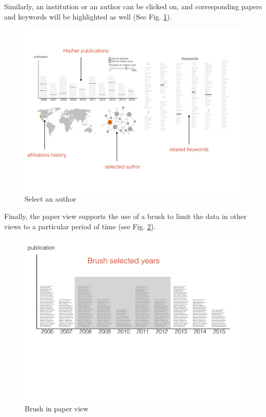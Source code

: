 \documentclass[dvips,12pt]{article}
\begin{document}
Similarly, an institution or an author can be clicked on, and corresponding papers and keywords will be highlighted as well (See Fig. \ref{fig:select_author}).

\begin{figure}[htb!]
    \centering
    \includegraphics[width=160mm]{visproposalDrawing_page_Part_5.pdf}
    \caption{Select an author}
    \label{fig:select_author}
\end{figure}

Finally, the paper view supports the use of a brush to limit the data in other views to a particular period of time (see Fig. \ref{fig:brush}).

\begin{figure}[htb!]
    \centering
    \includegraphics[width=160mm]{visproposalDrawing_page_Part_7.pdf}
    \caption{Brush in paper view}
    \label{fig:brush}
\end{figure}
\end{document}
